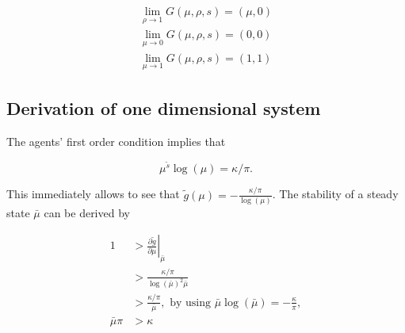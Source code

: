 \documentclass[../../main.tex]{subfiles}
\begin{document}
\begin{equation}
    \begin{split}
        \lim_{\rho \rightarrow 1} G(\mu, \rho, s) = (\mu, 0) \\
        \lim_{\mu \rightarrow 0} G(\mu, \rho, s) = (0, 0) \\
        \lim_{\mu \rightarrow 1} G(\mu, \rho, s) = (1, 1)
    \end{split}
\end{equation}

\subsection{Derivation of one dimensional system}

The agents' first order condition implies that

\begin{equation}
    \mu^{\tilde{s}} \log(\mu) = \kappa / \pi.
\end{equation}

This immediately allows to see that $\tilde{g}(\mu) = -\frac{\kappa / \pi}{\log(\mu)}$. The stability of a steady state $\bar{\mu}$ can be derived by

\begin{equation}
    \begin{split}
        1 &> \left.\frac{\partial \tilde{g}}{\partial \mu}\right\rvert_{\bar{\mu}} \\
        &> \frac{\kappa / \pi}{\log(\bar{\mu})^2 \bar{\mu}} \\
        &> \frac{\kappa / \pi}{\bar{\mu}}, \text{ by using } \bar{\mu} \log(\bar{\mu}) = -\frac{\kappa}{\pi}, \\
        \bar{\mu} \pi &> \kappa
    \end{split}
\end{equation}

\begin{figure}
\end{figure}
\end{document}
